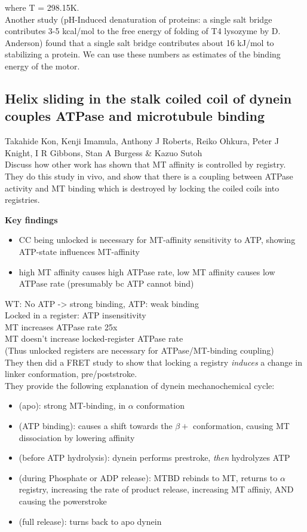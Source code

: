 \documentclass[10pt]{article} %
\begin{document}
where T = 298.15K.\\

Another study (pH-Induced denaturation of proteins: a single salt bridge contributes 3-5 kcal/mol to the free energy of folding of T4 lysozyme by D. Anderson) found that
a single salt bridge contributes about 16 kJ/mol to stabilizing a protein. We can use these numbers as estimates of the binding energy of the motor.\\

\subsection{Helix sliding in the stalk coiled coil of dynein couples ATPase and microtubule binding}
Takahide Kon, Kenji Imamula, Anthony J Roberts, Reiko Ohkura, Peter J Knight, I R Gibbons, Stan A Burgess \& Kazuo Sutoh\\
Discuss how other work has shown that MT affinity is controlled by registry. They do this study in vivo, and show that there is a coupling between ATPase activity and MT binding which is destroyed by locking the coiled coils into registries.

\textbf{Key findings}
\begin{itemize}
\item CC being unlocked is necessary for MT-affinity sensitivity to ATP, showing ATP-state influences MT-affinity
\item high MT affinity causes high ATPase rate, low MT affinity causes low ATPase rate (presumably bc ATP cannot bind)
\end{itemize}

WT: No ATP -> strong binding, ATP: weak binding\\
Locked in a register: ATP insensitivity\\
MT increases ATPase rate 25x\\
MT doesn't increase locked-register ATPase rate\\
(Thus unlocked registers are necessary for ATPase/MT-binding coupling)\\

They then did a FRET study to show that locking a registry \textit{induces} a change in linker conformation, pre/poststroke.\\

They provide the following explanation of dynein mechanochemical cycle:

\begin{itemize}
\item (apo): strong MT-binding, in $\alpha$ conformation
\item (ATP binding): causes a shift towards the $\beta+$ conformation, causing MT dissociation by lowering affinity
\item (before ATP hydrolysis): dynein performs prestroke, \textit{then} hydrolyzes ATP
\item (during Phosphate or ADP release): MTBD rebinds to MT, returns to $\alpha$ registry, increasing the rate of product release, increasing MT affiniy, AND causing the powerstroke
\item (full release): turns back to apo dynein
\end{itemize}
\end{document}
